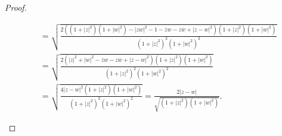 \documentclass[../../main.tex]{subfiles}%
\begin{document}
\begin{proof}
\begin{enumerate}[(1)]
\begin{scriptsize}
\begin{align*}
&=\sqrt{\frac{2\left( \left( 1+|z|^2 \right) \left( 1+|w|^2 \right) -\left| zw \right|^2-1-\overline{z}w-z\overline{w}+\left| z-w \right|^2 \right) \left( 1+|z|^2 \right) \left( 1+|w|^2 \right)}{\left( 1+|z|^2 \right) ^2\left( 1+|w|^2 \right) ^2}}
\\
&=\sqrt{\frac{2\left( \left| z \right|^2+\left| w \right|^2-\overline{z}w-z\overline{w}+\left| z-w \right|^2 \right) \left( 1+|z|^2 \right) \left( 1+|w|^2 \right)}{\left( 1+|z|^2 \right) ^2\left( 1+|w|^2 \right) ^2}}
\\
&=\sqrt{\frac{4\left| z-w \right|^2\left( 1+|z|^2 \right) \left( 1+|w|^2 \right)}{\left( 1+|z|^2 \right) ^2\left( 1+|w|^2 \right) ^2}}=\frac{2\left| z-w \right|}{\sqrt{\left( 1+|z|^2 \right) \left( 1+|w|^2 \right)}}.
\end{align*}
\end{scriptsize}


\end{enumerate}
\end{proof}
\end{document}
